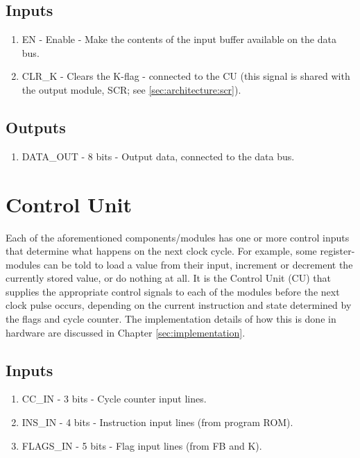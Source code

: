 \subsection*{Inputs}
\begin{enumerate}
\itemsep0em 
\item EN - Enable - Make the contents of the input buffer available on the data bus.
\item CLR\_K - Clears the K-flag - connected to the CU (this signal is shared with the output module, SCR; see \ref{sec:architecture:scr}).
\end{enumerate}

\subsection*{Outputs}
\begin{enumerate}
\itemsep0em 
\item DATA\_OUT - 8 bits - Output data, connected to the data bus.
\end{enumerate}



\section{Control Unit} \label{sec:architecture:cu}
Each of the aforementioned components/modules has one or more control inputs that determine what happens on the next clock cycle. For example, some register-modules can be told to load a value from their input, increment or decrement the currently stored value, or do nothing at all. It is the Control Unit (CU) that supplies the appropriate control signals to each of the modules before the next clock pulse occurs, depending on the current instruction and state determined by the flags and cycle counter. The implementation details of how this is done in hardware are discussed in Chapter \ref{sec:implementation}.

\subsection*{Inputs}
\begin{enumerate}
\itemsep0em
\item CC\_IN - 3 bits - Cycle counter input lines.
\item INS\_IN - 4 bits - Instruction input lines (from program ROM).
\item FLAGS\_IN - 5 bits - Flag input lines (from FB and K).
\end{enumerate}

